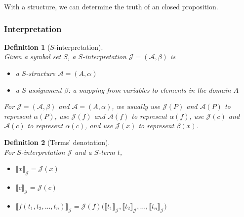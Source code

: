 \documentclass{ctexart}
\newcommand{\。}{．} %
\newenvironment{lvse}{
    \begin{tcolorbox}[enhanced, breakable, colback=qlv, boxrule=0pt, frame hidden,
        borderline west={0.7mm}{0.1mm}{slv}]
    }
    {\end{tcolorbox}}
\theoremstyle{t} %
\newtheorem{dyhj}{\color{slv} Definition}[subsection] %
\newenvironment{dy}{\begin{lvse}\begin{dyhj}}{\end{dyhj}\end{lvse}}
\begin{document}
With a structure, we can determine the truth of an closed proposition.

\subsubsection{Interpretation}

\begin{dy}[$S$-interpretation]\quad \\
    Given a symbol set $S$, a $S$-interpretation $\mathcal{J} = (\mathcal{A}, \beta)$ is
    \begin{itemize}
        \item a \( S \)-structure \( \mathcal{A} = (A, \alpha) \)
        \item a \( S \)-assignment \( \beta \): a mapping from variables to elements in the domain \( A \)
    \end{itemize}
        
    For \( \mathcal{J} = (\mathcal{A}, \beta) \) and \( \mathcal{A} = (A, \alpha) \), we usually use \( \mathcal{J}(P) \) and \( \mathcal{A}(P) \) to represent \( \alpha(P) \), use \( \mathcal{J}(f) \) and \( \mathcal{A}(f) \) to represent \( \alpha(f) \), use \( \mathcal{J}(c) \) and \( \mathcal{A}(c) \) to represent \( \alpha(c) \), and use \( \mathcal{J}(x) \) to represent \( \beta(x) \).        
\end{dy}

\begin{dy}[Terms' denotation]\quad \\
    For $S$-interpretation $\mathcal{J}$ and a $S$-term $t$,
    \begin{itemize}
        \item $\llbracket x \rrbracket_{\mathcal{J}} = \mathcal{J}(x)$
        \item $\llbracket c \rrbracket_{\mathcal{J}} = \mathcal{J}(c)$
        \item $\llbracket f(t_1, t_2, \dots, t_n) \rrbracket_{\mathcal{J}} = \mathcal{J}(f) \big( \llbracket t_1 \rrbracket_{\mathcal{J}}, \llbracket t_2 \rrbracket_{\mathcal{J}}, \dots, \llbracket t_n \rrbracket_{\mathcal{J}} \big)$
    \end{itemize}
\end{dy}
\end{document}
